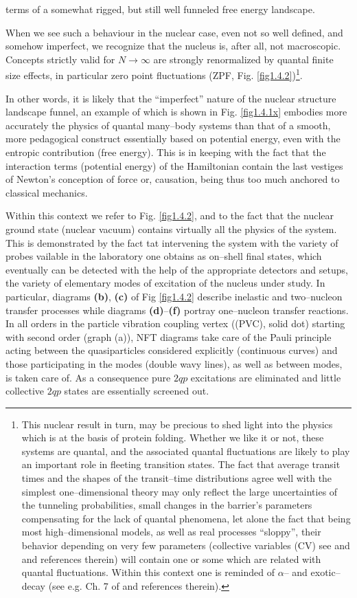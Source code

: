 terms of a somewhat rigged, but still well funneled free energy landscape.

When we see such a behaviour in the nuclear case, even not so well defined, and somehow imperfect, we recognize that the nucleus is, after all, not macroscopic. Concepts strictly valid for $N\rightarrow\infty$ are strongly renormalized by quantal finite size effects, in particular zero point fluctuations (ZPF, Fig. \ref{fig1.4.2})\footnote{This nuclear result in turn, may be precious to shed light into the physics which is at the basis of protein folding. Whether we like it or not, these systems are quantal, and the associated quantal fluctuations are likely to play an important role in fleeting transition states. The fact that average transit times and the shapes of the transit--time distributions agree well with the simplest one--dimensional theory may only reflect the large uncertainties of the tunneling probabilities, small changes in the barrier's parameters compensating for the lack of quantal phenomena, let alone the fact that being most high--dimensional models, as well as real processes ``sloppy'', their behavior depending on very few parameters (collective variables (CV) see \cite{Buchanan:15} and \cite{Transtrum:14} and references therein) will contain one or some which are related with quantal fluctuations.  Within this context one is reminded of $\alpha$-- and exotic--decay (see e.g. Ch. 7 of \cite{Brink:05} and references therein).}.

In other words, it is likely that the ``imperfect'' nature of the nuclear structure landscape funnel, an example of which is shown in Fig. \ref{fig1.4.1x} embodies more accurately the physics of quantal many--body systems than that of a smooth, more pedagogical construct essentially based on potential energy, even with the entropic contribution (free energy). This is in keeping with the fact that the interaction terms (potential energy) of the Hamiltonian contain the last vestiges of Newton's conception of force or, causation, being thus too much anchored to classical mechanics.


Within this context we refer to Fig. \ref{fig1.4.2}, and to the fact that the nuclear ground state (nuclear vacuum)  contains  virtually all the physics of the system. This is demonstrated by the fact tat intervening the system with the variety of probes vailable in the laboratory one obtains as on--shell final states, which eventually can be detected with the help of the appropriate detectors and setups, the variety of elementary modes of excitation of the nucleus under study. In particular, diagrams \textbf{(b)}, \textbf{(c)} of Fig \ref{fig1.4.2} describe inelastic and two--nucleon transfer processes while diagrams  \textbf{(d)}--\textbf{(f)} portray  one--nucleon transfer reactions. In all orders in the particle vibration coupling vertex ((PVC), solid dot) starting with second order (graph (a)), NFT diagrams take care of the  Pauli principle acting between the quasiparticles considered explicitly (continuous curves) and those participating in the modes (double wavy lines), as well as between modes, is taken care of. As a consequence pure $2qp$ excitations are eliminated and little collective $2qp$ states are essentially screened out.

